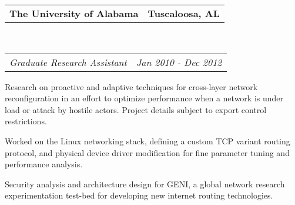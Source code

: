 \documentclass[10pt,letterpaper]{article}
\makeatletter
\newcommand{\headerrow}[2]
{\begin{tabular*}{\linewidth}{l@{\extracolsep{\fill}}r}
	#1 &
	#2 \\
\end{tabular*}}
\newcommand{\employment}[5]{
	\headerrow
		{\textbf{#1}}
		{\textbf{#2}}
	\\
	\headerrow
		{\emph{#3}}
		{\emph{#4}}
	\begin{itemize*}
		\item #5
	\end{itemize*}
}
\makeatother
\begin{document}
\employment{The University of Alabama}{Tuscaloosa, AL}{Graduate Research Assistant}{Jan 2010 - Dec 2012}{
Research on proactive and adaptive techniques for cross-layer network
reconfiguration in an effort to optimize performance when a network
is under load or attack by hostile actors. Project details subject to export control restrictions.
\item Worked on the Linux networking stack, defining a custom TCP variant
  routing protocol, and physical device driver modification for fine parameter tuning and performance analysis.
\item Security analysis and architecture design for GENI, a global network
  research experimentation test-bed for developing new internet routing technologies.
}

\end{document}
